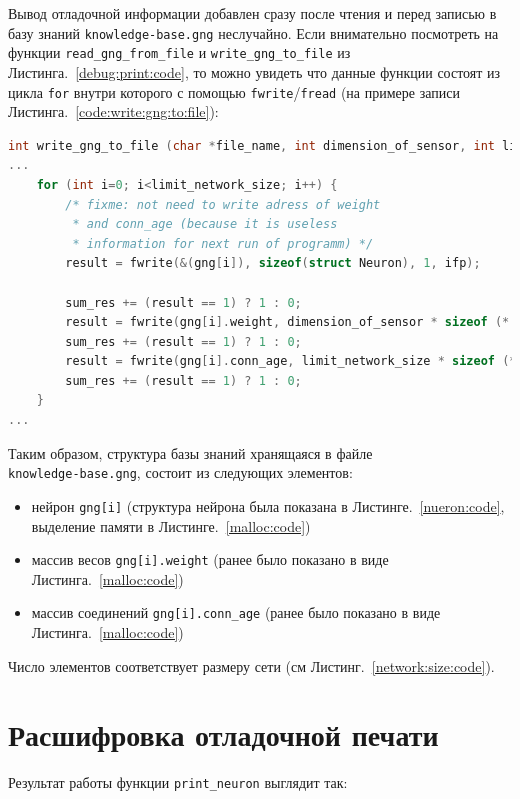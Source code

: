 \documentclass[unicode, 12pt, a4paper,oneside,fleqn]{article}
\begin{document}
Вывод отладочной информации добавлен сразу после чтения и перед
записью в базу знаний \verb'knowledge-base.gng' неслучайно. Если
внимательно посмотреть на функции \verb'read_gng_from_file' и
\verb'write_gng_to_file' из Листинга.~\ref{debug:print:code}, то можно
увидеть что данные функции состоят из цикла \verb'for' внутри которого
с помощью \verb'fwrite'/\verb'fread' (на примере записи
Листинга.~\ref{code:write:gng:to:file}):

\begin{lstlisting}[language=C,
  caption={Функция write\_gng\_to\_file из файла growing-neural-gas.c},
  captionpos=b,
  label={code:write:gng:to:file},
  linewidth=16.5cm]
int write_gng_to_file (char *file_name, int dimension_of_sensor, int limit_network_size, NEURON *gng)
...
	for (int i=0; i<limit_network_size; i++) {
		/* fixme: not need to write adress of weight
		 * and conn_age (because it is useless
		 * information for next run of programm) */
		result = fwrite(&(gng[i]), sizeof(struct Neuron), 1, ifp);

		sum_res += (result == 1) ? 1 : 0;
		result = fwrite(gng[i].weight, dimension_of_sensor * sizeof (* (gng[i].weight)), 1, ifp);
		sum_res += (result == 1) ? 1 : 0;
		result = fwrite(gng[i].conn_age, limit_network_size * sizeof (* (gng[i].conn_age)), 1, ifp);
		sum_res += (result == 1) ? 1 : 0;
	}
...
\end{lstlisting}

Таким образом, структура базы знаний хранящаяся в файле\\
\verb'knowledge-base.gng', состоит из следующих элементов:
\begin{itemize}
\item нейрон \verb'gng[i]' (структура нейрона была
  показана в Листинге.~\ref{nueron:code}, выделение памяти в
  Листинге.~\ref{malloc:code})
\item массив весов \verb'gng[i].weight' (ранее было
  показано в виде Листинга.~\ref{malloc:code})
\item массив соединений \verb'gng[i].conn_age' (ранее было показано в виде
  Листинга.~\ref{malloc:code})
\end{itemize}
Число элементов соответствует размеру сети (см
Листинг.~\ref{network:size:code}).

\clearpage
\section{Расшифровка отладочной печати}
Результат работы функции \verb'print_neuron' выглядит так:
\end{document}
